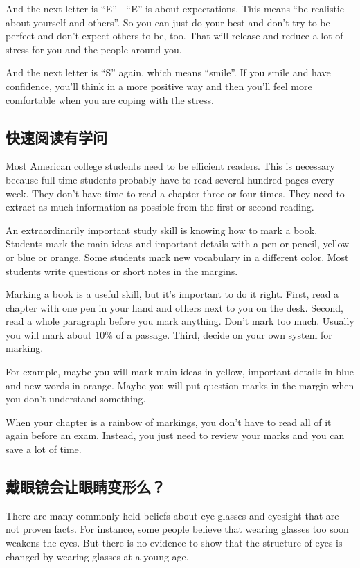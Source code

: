 And the next letter is “E”—“E” is about expectations. This
means “be realistic about yourself and others”. So
you can just do your best and don't try to be perfect and
don't expect others to be, too. That will release and reduce
a lot of stress for you and the people around you.


And the next letter is “S” again, which means
“smile”. If you smile and have confidence, you'll think in a
more positive way and then you'll feel more comfortable
when you are coping with the stress.

\subsection{快速阅读有学问}
\begin{margintable}\vspace{-2cm}\footnotesize
\end{margintable}
Most American college students need to be efficient readers.
This is necessary because full-time students probably
have to read several hundred pages every week. They
don't have time to read a chapter three or four times.
They need to extract as much information as possible from
the first or second reading.

An extraordinarily important study skill is knowing how to
mark a book. Students mark the main ideas and important
details with a pen or pencil, yellow or blue or orange.
Some students mark new vocabulary in a different color.
Most students write questions or short notes in the margins.

Marking a book is a useful skill, but it's important to do it
right. First, read a chapter with one pen in your hand and
others next to you on the desk. Second, read a whole
paragraph before you mark anything. Don't mark too
much. Usually you will mark about 10\% of a passage.
Third, decide on your own system for marking.

For example, maybe you will mark main ideas in yellow,
important details in blue and new words in orange. Maybe
you will put question marks in the margin when you don't
understand something.

When your chapter is a rainbow of markings, you don't
have to read all of it again before an exam. Instead,
you just need to review your marks and you can save a lot
of time.
\subsection{戴眼镜会让眼睛变形么？}
\begin{margintable}\vspace{-2cm}\footnotesize
\end{margintable}
There are many commonly held beliefs about eye
glasses and eyesight that are not proven facts. For instance,
some people believe that wearing glasses too
soon weakens the eyes. But there is no evidence to show
that the structure of eyes is changed by wearing glasses at
a young age.

